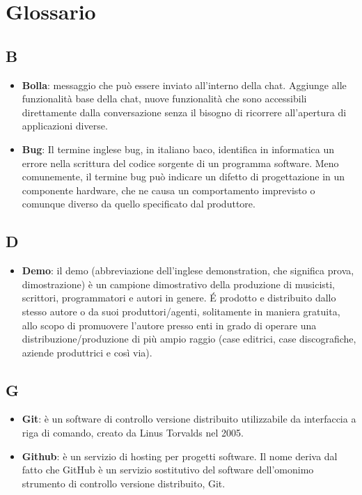 \newpage

\appendix
\setcounter{secnumdepth}{0}
\section{Glossario}

\subsection*{B}
\begin{itemize}
\item 
\textbf{Bolla}: messaggio che può essere inviato all'interno della chat. Aggiunge alle funzionalità base della chat, nuove funzionalità che sono accessibili direttamente dalla conversazione senza il bisogno di ricorrere all'apertura di applicazioni diverse.
\item
\textbf{Bug}: Il termine inglese bug, in italiano baco, identifica in informatica un errore nella scrittura del codice sorgente di un programma software. Meno comunemente, il termine bug può indicare un difetto di progettazione in un componente hardware, che ne causa un comportamento imprevisto o comunque diverso da quello specificato dal produttore.
\end{itemize}
\newpage

\subsection*{D}
\begin{itemize}
\item
\textbf{Demo}: il demo (abbreviazione dell'inglese demonstration, che significa prova, dimostrazione) è un campione dimostrativo della produzione di musicisti, scrittori, programmatori e autori in genere. \'E prodotto e distribuito dallo stesso autore o da suoi produttori/agenti, solitamente in maniera gratuita, allo scopo di promuovere l'autore presso enti in grado di operare una distribuzione/produzione di più ampio raggio (case editrici, case discografiche, aziende produttrici e così via).
\end{itemize}
\newpage

\subsection*{G}
\begin{itemize}
	\item
    \textbf{Git}: è un software di controllo versione distribuito utilizzabile da interfaccia a riga di comando, creato da Linus Torvalds nel 2005.
	\item
	\textbf{Github}: è un servizio di hosting per progetti software. Il nome deriva dal fatto che GitHub è un servizio sostitutivo del software dell'omonimo strumento di controllo versione distribuito, Git.
\end{itemize}
\newpage

